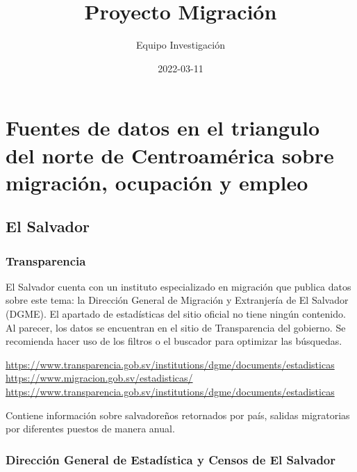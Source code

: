 \documentclass[
]{book}
\title{Proyecto Migración}
\author{Equipo Investigación}
\date{2022-03-11}
\begin{document}
\maketitle

{
\setcounter{tocdepth}{1}
\tableofcontents
}
\hypertarget{fuentes-de-datos-en-el-triangulo-del-norte-de-centroamuxe9rica-sobre-migraciuxf3n-ocupaciuxf3n-y-empleo}{%
\chapter{Fuentes de datos en el triangulo del norte de Centroamérica sobre migración, ocupación y empleo}\label{fuentes-de-datos-en-el-triangulo-del-norte-de-centroamuxe9rica-sobre-migraciuxf3n-ocupaciuxf3n-y-empleo}}

\hypertarget{el-salvador}{%
\section{El Salvador}\label{el-salvador}}

\hypertarget{transparencia}{%
\subsection{Transparencia}\label{transparencia}}

El Salvador cuenta con un instituto especializado en migración que publica datos sobre este tema: la Dirección General de Migración y Extranjería de El Salvador (DGME). El apartado de estadísticas del sitio oficial no tiene ningún contenido. Al parecer, los datos se encuentran en el sitio de Transparencia del gobierno. Se recomienda hacer uso de los filtros o el buscador para optimizar las búsquedas.

\url{https://www.transparencia.gob.sv/institutions/dgme/documents/estadisticas}
\url{https://www.migracion.gob.sv/estadisticas/}
\url{https://www.transparencia.gob.sv/institutions/dgme/documents/estadisticas}

Contiene información sobre salvadoreños retornados por país, salidas migratorias por diferentes puestos de manera anual.

\hypertarget{direcciuxf3n-general-de-estaduxedstica-y-censos-de-el-salvador}{%
\subsection{Dirección General de Estadística y Censos de El Salvador}\label{direcciuxf3n-general-de-estaduxedstica-y-censos-de-el-salvador}}
\end{document}
